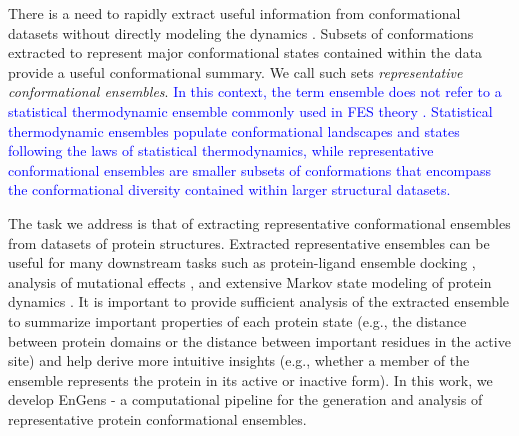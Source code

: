 \documentclass[unnumsec,webpdf,contemporary,large,numsquare]{oup-authoring-template}%
\theoremstyle{thmstyleone}%
\theoremstyle{thmstyletwo}%
\theoremstyle{thmstylethree}%
\begin{document}
There is a need to rapidly extract useful information from conformational datasets without directly modeling the dynamics \citep{peng_clustering_2018}. Subsets of conformations extracted to represent major conformational states contained within the data provide a useful conformational summary. We call such sets \textit{representative conformational ensembles}. \textcolor{blue}{In this context, the term ensemble does not refer to a statistical thermodynamic ensemble commonly used in FES theory \citep{hilser_statistical_2006}. Statistical thermodynamic ensembles populate conformational landscapes and states following the laws of statistical thermodynamics, while representative conformational ensembles are smaller subsets of conformations that encompass the conformational diversity contained within larger structural datasets.} 

The task we address is that of extracting representative conformational ensembles from datasets of protein structures. Extracted representative ensembles can be useful for many downstream tasks such as protein-ligand ensemble docking \citep{hall-swan_dinc-covid_2021}, analysis of mutational effects \citep{kannan_ensemble_2022}, and extensive Markov state modeling of protein dynamics \citep{abella_markov_2020, chan_markov_2021}. It is important to provide sufficient analysis of the extracted ensemble to summarize important properties of each protein state (e.g., the distance between protein domains or the distance between important residues in the active site) and help derive more intuitive insights (e.g., whether a member of the ensemble represents the protein in its active or inactive form). In this work, we develop EnGens - a computational pipeline for the generation and analysis of representative protein conformational ensembles.
\end{document}
